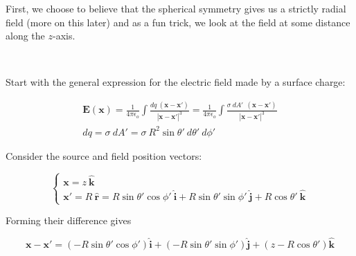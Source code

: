 \documentclass{article}
\numberwithin{equation}{section}
\newcommand{\ihat}{\mathbf{\hat{i}}}
\newcommand{\jhat}{\mathbf{\hat{j}}}
\newcommand{\khat}{\mathbf{\hat{k}}}
\newcommand{\rhat}{\mathbf{\hat{r}}}
\newcommand{\bunny}[1][]{
    \tikz \fill [scale=1ex/500,yscale=1,#1] svg "M3831 8683 c-70 -71 -235 -358 -326 -567 -168 -385 -252 -748 -275 -1181 -5 -104 -9 -199 -7 -209 2 -16 -10 -21 -88 -36 -158 -31 -407 -112 -530 -173 -117 -58 -239 -150 -365 -277 -178 -177 -305 -366 -407 -604 -44 -102 -55 -118 -136 -201 -110 -113 -148 -183 -154 -288 -4 -53 0 -88 14 -132 12 -37 16 -70 12 -85 -4 -14 -7 -62 -8 -107 -3 -225 125 -386 369 -461 66 -20 157 -35 282 -47 l68 -7 -25 -47 c-41 -81 -59 -197 -52 -341 10 -200 66 -413 174 -660 153 -347 352 -632 640 -914 l104 -102 9 -95 c13 -131 12 -378 -1 -441 -25 -115 -92 -205 -180 -242 -138 -58 -168 -77 -220 -139 -92 -109 -110 -180 -63 -237 63 -75 165 -100 429 -107 159 -4 215 -2 275 11 267 57 455 273 539 619 20 84 29 107 41 103 8 -3 89 -37 179 -76 197 -86 466 -177 651 -220 74 -18 142 -34 150 -37 8 -3 -14 -15 -50 -28 -257 -88 -340 -205 -227 -319 48 -47 82 -58 257 -78 225 -26 1652 -9 1850 23 75 12 154 51 184 92 22 30 23 43 15 268 -3 65 0 83 25 133 50 102 131 161 255 187 46 9 67 8 150 -11 230 -54 428 -7 556 131 71 77 99 149 92 240 -7 115 -65 203 -185 282 -218 145 -282 308 -264 665 30 563 -100 1035 -383 1397 -78 99 -236 254 -335 327 -319 238 -731 392 -1245 468 -301 44 -438 49 -1090 37 -69 -2 -107 3 -160 20 l-70 22 3 238 c3 183 0 265 -12 356 -18 123 -53 275 -81 340 -16 38 -16 40 9 70 456 567 686 1088 725 1647 21 289 -41 691 -116 749 -28 23 -72 27 -106 10 -63 -31 -322 -342 -452 -541 -38 -59 -73 -108 -77 -108 -5 0 -8 11 -8 24 0 14 -9 74 -21 133 -44 228 -158 517 -217 547 -50 26 -80 20 -121 -21z";
}
\begin{document}
First, we choose to believe that the spherical symmetry gives us a strictly radial field (more on this later) and as a fun trick, we look at the field at some distance along the $z$-axis.

\begin{minipage}{0.4\textwidth}
\begin{flushleft}
\begin{figure}[H]
\label{fig:2:e}
\end{figure}
\end{flushleft}
\end{minipage}
~
\begin{minipage}{0.6\textwidth}
\begin{flushright}
\parbox[l]{\textwidth}{Start with the general expression for the electric field made by a surface charge:}
\begin{gather*}
    \bm{E}(\bm{x}) = \frac{1}{4\pi\epsilon_o} \int \frac{dq\ \left( \bm{x} - \bm{x'} \right)}{\left| \bm{x} - \bm{x'} \right|^3} = \frac{1}{4\pi\epsilon_o} \int \frac{\sigma\ dA'\ \ \left( \bm{x} - \bm{x'} \right)}{\left| \bm{x} - \bm{x'} \right|^3} \\[0.3cm]
    dq = \sigma\ dA' = \sigma\ R^2 \sin{\theta'}\ d\theta'\ d\phi'
\end{gather*}

\parbox[l]{\textwidth}{Consider the source and field position vectors:}
\begin{equation*}
    \begin{cases} \displaystyle \bm{x} = z\ \khat \\ \displaystyle \bm{x'} = R\ \rhat = R\sin{\theta'}\cos{\phi'}\ \ihat + R\sin{\theta'}\sin{\phi'}\ \jhat + R\cos{\theta'}\ \khat \end{cases}
\end{equation*}

\parbox[l]{\textwidth}{Forming their difference gives}
\begin{equation*}
    \bm{x} - \bm{x'} = \left( -R\sin{\theta'}\cos{\phi'} \right) \ihat + \left( -R\sin{\theta'}\sin{\phi'} \right) \jhat + \left( z - R\cos{\theta'} \right) \khat
\end{equation*}
\end{flushright}
\end{minipage}
\end{document}
